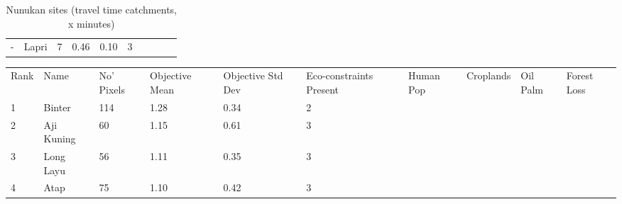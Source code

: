 \begin{table}[ht]
\begin{tabular}{C{0.05\textwidth}C{0.15\textwidth}C{0.08\textwidth}C{0.08\textwidth}C{0.08\textwidth}C{0.08\textwidth}C{0.08\textwidth}C{0.08\textwidth}C{0.08\textwidth}C{0.08\textwidth}}
  {-} & Lapri &   7 & \textcolor[HTML]{000000}{0.46} & \textcolor[HTML]{000000}{0.10} & \textcolor[HTML]{000000}{3} &  &  &  &  \\ 
  \end{tabular}
\endgroup
\caption{Nunukan sites (travel time catchments, x minutes)} 
\label{tab:nunukan_time}
\end{table}
\begin{table}[ht]
\centering
\begingroup\fontsize{9pt}{10pt}\selectfont
\begin{tabular}{C{0.05\textwidth}C{0.15\textwidth}C{0.08\textwidth}C{0.08\textwidth}C{0.08\textwidth}C{0.08\textwidth}C{0.08\textwidth}C{0.08\textwidth}C{0.08\textwidth}C{0.08\textwidth}}
 Rank & Name & No' Pixels & Objective Mean & Objective Std Dev & Eco-constraints  Present & Human Pop & Croplands & Oil Palm & Forest Loss \\ 
 {1} & Binter & 114 & \textcolor[HTML]{FFFFFF}{1.28} & \textcolor[HTML]{000000}{0.34} & \textcolor[HTML]{000000}{2} &  &  &  &  \\ 
  {2} & Aji Kuning &  60 & \textcolor[HTML]{FFFFFF}{1.15} & \textcolor[HTML]{FFFFFF}{0.61} & \textcolor[HTML]{FFFFFF}{3} &  &  &  &  \\ 
  {3} & Long Layu &  56 & \textcolor[HTML]{FFFFFF}{1.11} & \textcolor[HTML]{000000}{0.35} & \textcolor[HTML]{FFFFFF}{3} &  &  &  &  \\ 
  {4} & Atap &  75 & \textcolor[HTML]{FFFFFF}{1.10} & \textcolor[HTML]{FFFFFF}{0.42} & \textcolor[HTML]{FFFFFF}{3} &  &  &  &  \\ 

\end{tabular}
\end{table}
